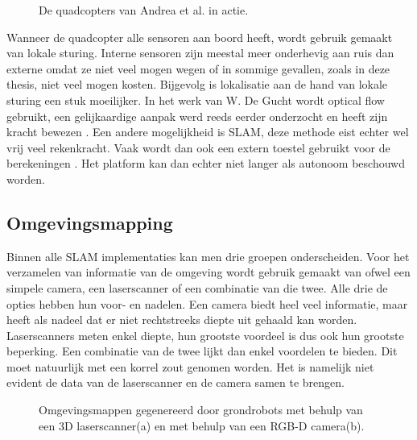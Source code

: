 \begin{figure}[h]
	\centering
	\hspace{0.01\linewidth}
	\caption{De quadcopters van Andrea et al. in actie.} \label{fig:quadAndrea}
\end{figure}

\npar Wanneer de quadcopter alle sensoren aan boord heeft, wordt gebruik gemaakt van lokale sturing. Interne sensoren zijn meestal meer onderhevig aan ruis dan externe omdat ze niet veel mogen wegen of in sommige gevallen, zoals in deze thesis, niet veel mogen kosten. Bijgevolg is lokalisatie aan de hand van lokale sturing een stuk moeilijker. In het werk van W. De Gucht wordt optical flow gebruikt, een gelijkaardige aanpak werd reeds eerder onderzocht en heeft zijn kracht bewezen \cite{paper:opticalFlowQuad}. Een andere mogelijkheid is SLAM, deze methode eist echter wel vrij veel rekenkracht. Vaak wordt dan ook een extern toestel gebruikt voor de berekeningen \cite{paper:SLAMQuad}. Het platform kan dan echter niet langer als autonoom beschouwd worden.

\subsection{Omgevingsmapping} \label{sec:omgmapping}
Binnen alle SLAM implementaties kan men drie groepen onderscheiden. Voor het verzamelen van informatie van de omgeving wordt gebruik gemaakt van ofwel een simpele camera, een laserscanner of een combinatie van die twee. Alle drie de opties hebben hun voor- en nadelen. Een camera biedt heel veel informatie, maar heeft als nadeel dat er niet rechtstreeks diepte uit gehaald kan worden. Laserscanners meten enkel diepte, hun grootste voordeel is dus ook hun grootste beperking. Een combinatie van de twee lijkt dan enkel voordelen te bieden. Dit moet natuurlijk met een korrel zout genomen worden. Het is namelijk niet evident de data van de laserscanner en de camera samen te brengen.

\begin{figure}[h]
	\centering
	 \label{fig:3DGrounda}
	\hspace{0.01\linewidth}
	 \label{fig:3DGroundb}
	\caption{Omgevingsmappen gegenereerd door grondrobots met behulp van een 3D laserscanner(a) en met behulp van een RGB-D camera(b).}
\end{figure}


